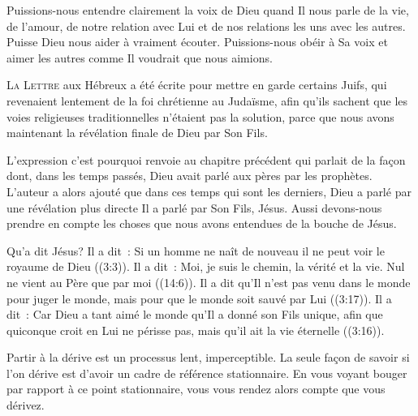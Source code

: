 Puissions-nous entendre clairement la voix de Dieu quand Il nous parle
 de la vie, de l'amour, de notre relation avec Lui et de nos relations
 les uns avec les autres. Puisse Dieu nous aider à vraiment écouter.
 Puissions-nous obéir à Sa voix et aimer les autres comme Il voudrait
 que nous aimions.

\dvrule






\lettrine{L}{a Lettre} aux Hébreux a été écrite pour mettre en garde
 certains Juifs, qui revenaient lentement de la foi chrétienne au Judaïsme,
 afin qu'ils sachent que les voies religieuses traditionnelles
 n'étaient pas la solution, parce que nous avons maintenant
 la révélation finale de Dieu par Son Fils. 

L'expression \Og c'est pourquoi \Fg{} renvoie au chapitre précédent
 qui parlait de la fa\c{c}on dont, dans les temps passés,
 Dieu avait parlé aux pères par les prophètes.
 L'auteur a alors ajouté que dans ces temps qui sont les derniers,
 Dieu a parlé par une révélation plus directe
 \ocadr Il a parlé par Son Fils, Jésus.
 Aussi devons-nous prendre en compte les choses que nous avons entendues
 de la bouche de Jésus. 


Qu'a dit Jésus? Il a dit~: 
 \Og Si un homme ne naît de nouveau il ne peut voir le royaume de Dieu \Fg{}
 ((3:3)).
 Il a dit~: 
 \Og Moi, je suis le chemin, la vérité et la vie.
 Nul ne vient au Père que par moi \Fg{} ((14:6)).
 Il a dit qu'Il n'est pas venu \Og dans le monde pour juger le monde,
 mais pour que le monde soit sauvé par Lui \Fg{} ((3:17)).
 Il a dit~: 
 \Og Car Dieu a tant aimé le monde qu'Il a donné son Fils unique,
 afin que quiconque croit en Lui ne périsse pas,
 mais qu'il ait la vie éternelle \Fg{} ((3:16)). 

Partir à la dérive est un processus lent, imperceptible.
 La seule fa\c{c}on de savoir si l'on dérive est d'avoir un cadre de référence
 stationnaire.
 En vous voyant bouger par rapport à ce point stationnaire,
 vous vous rendez alors compte que vous dérivez. 

